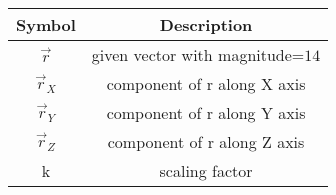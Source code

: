 \begin{tabular}[12pt]{ |c| c|}
    \hline
      \textbf{Symbol} & \textbf{Description}\\ 
      \hline
      $\Vec{r}$ & given vector with magnitude=$14$\\
      \hline
      $\Vec{r}_X$ & component of r along X axis\\
      \hline
      $\Vec{r}_Y$ & component of r along Y axis\\
      \hline
       $\Vec{r}_Z$ & component of r along Z axis\\
       \hline
       k & scaling factor\\
       \hline
    \end{tabular}